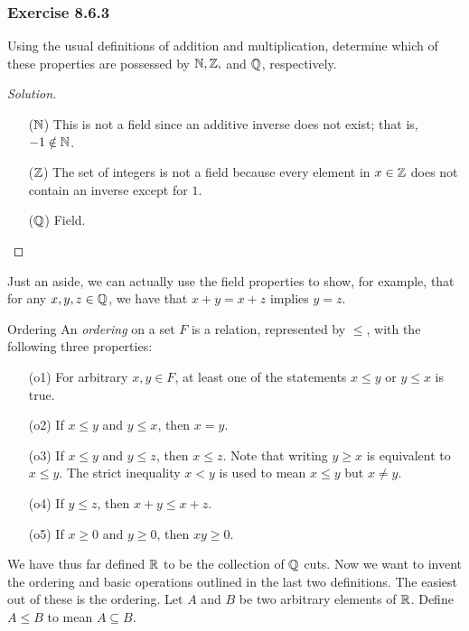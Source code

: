 \subsubsection{Exercise 8.6.3}  Using the usual definitions of addition and multiplication, determine which of these properties are possessed by \( \mathbb{N}  , \mathbb{Z},  \) and \( \mathbb{Q}  \), respectively.
\begin{proof}[Solution]
\begin{enumerate}
    \item[(\( \mathbb{N}  \))] This is not a field since an additive inverse does not exist; that is, \( - 1 \notin \mathbb{N} \). 
    \item[(\( \mathbb{Z}  \))] The set of integers is not a field because every element in \( x \in \mathbb{Z}  \) does not contain an inverse except for \(  1  \).
    \item[(\( \mathbb{Q} \))] Field.
\end{enumerate}
\end{proof}
 
Just an aside, we can actually use the field properties to show, for example, that for any \( x ,y , z  \in \mathbb{Q}  \), we have that \( x + y = x + z  \) implies \( y = z  \).

\begin{definition}{Ordering}{}
    An \textit{ordering} on a set \( F  \) is a relation, represented by \(  \leq  \), with the following three properties:
    \begin{enumerate}
        \item[(o1)] For arbitrary \( x,y \in F  \), at least one of the statements \( x \leq y  \) or \(  y \leq x  \) is true.
        \item[(o2)] If \( x \leq y  \) and \( y \leq x  \), then \( x = y  \).
        \item[(o3)] If \( x \leq y  \) and \( y \leq z  \), then \(  x \leq z  \).
        Note that writing \(  y \geq x  \) is equivalent to \( x \leq y  \). The strict inequality \( x < y  \) is used to mean \( x \leq y  \) but \( x \neq y  \).
        \item[(o4)] If \( y \leq z  \), then \( x + y \leq x + z  \).
        \item[(o5)] If \( x \geq 0  \) and \( y \geq 0  \), then \( xy \geq 0  \).
    \end{enumerate}
\end{definition}

We have thus far defined \( \mathbb{R}  \) to be the collection of \( \mathbb{Q}  \) cuts. Now we want to invent the ordering and basic operations outlined in the last two definitions. The easiest out of these is the ordering. Let \( A  \) and \(  B \) be two arbitrary elements of \( \mathbb{R}  \). Define \( A \leq B  \) to mean \( A \subseteq B  \).

